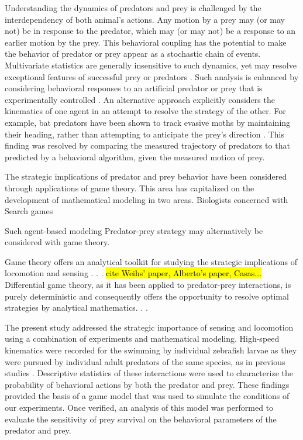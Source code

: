 \documentclass[]{rsos}%
\begin{document}
Understanding the dynamics of predators and prey is challenged by the interdependency of both animal's actions.
Any motion by a prey may (or may not) be in response to the predator, which may (or may not) be a response to an earlier motion by the prey. 
This behavioral coupling has the potential to make the behavior of predator or prey appear as a stochastic chain of events.
Multivariate statistics are generally insensitive to such dynamics, yet may resolve exceptional features of successful prey \cite{Walker:2005vn} or predators \cite{Wainwright:2001ufa}.
Such analysis is enhanced by considering behavioral responses to an artificial predator or prey that is experimentally controlled \cite{Gabbiani:1999wz,Stewart:2014cma}.
An alternative approach explicitly considers the kinematics of one agent in an attempt to resolve the strategy of the other.
For example, bat predators have been shown to track evasive moths by maintaining their heading, rather than attempting to anticipate the prey's direction \cite{Ghose:2006dk}. 
This finding was resolved by comparing the measured trajectory of predators to that predicted by a behavioral algorithm, given the measured motion of prey.

The strategic implications of predator and prey behavior have been considered through applications of game theory.
This area has capitalized on the development of mathematical modeling in two areas.
Biologists concerned with Search games 


Such agent-based modeling 
Predator-prey strategy may alternatively be considered with game theory.

Game theory offers an analytical toolkit for studying the strategic implications of locomotion and sensing . . .
\hl{cite Weihs' paper, Alberto's paper, Casas...}
Differential game theory, as it has been applied to predator-prey interactions, is purely deterministic and consequently offers the opportunity to resolve optimal strategies by analytical mathematics. . .

The present study addressed the strategic importance of sensing and locomotion using a combination of experiments and mathematical modeling. 
High-speed kinematics were recorded for the swimming by individual zebrafish larvae as they were pursued by individual adult predators of the same species, as in previous studies \cite{Stewart:2014cma, Soto:2015cj}.
Descriptive statistics of these interactions were used to characterize the probability of behavioral actions by both the predator and prey.
These findings provided the basis of a game model that was used to simulate the conditions of our experiments. 
Once verified, an analysis of this model was performed to evaluate the sensitivity of prey survival on the behavioral parameters of the predator and prey.
\end{document}
